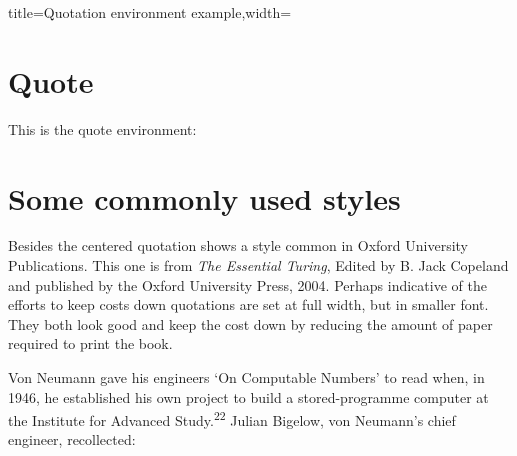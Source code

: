 \begin{tcblisting}{title=Quotation environment example,width=\textwidth}
\lorem

\begin{quotation}
\lipsum[2-3]
\end{quotation}
\end{tcblisting}

\section{Quote}
This is the quote environment:
\begin{quote}
\lipsum[1-2]
\end{quote}


\section{Some commonly used styles}

Besides the centered quotation  shows a style
common in Oxford University Publications. This one is from \textit{The Essential Turing}, Edited by B. Jack Copeland and  published by the Oxford University Press, 2004. Perhaps indicative of the efforts to keep costs down quotations are set at full width, but in smaller font. They
both look good and keep the cost down by reducing the amount of
paper required to print the book.

\topline

Von Neumann gave his engineers `On Computable Numbers' to read when, in
1946, he established his own project to build a stored-programme computer at
the Institute for Advanced Study.\textsuperscript{22} Julian Bigelow, von Neumann's chief engineer,
recollected:
\vspace*{-20pt}



